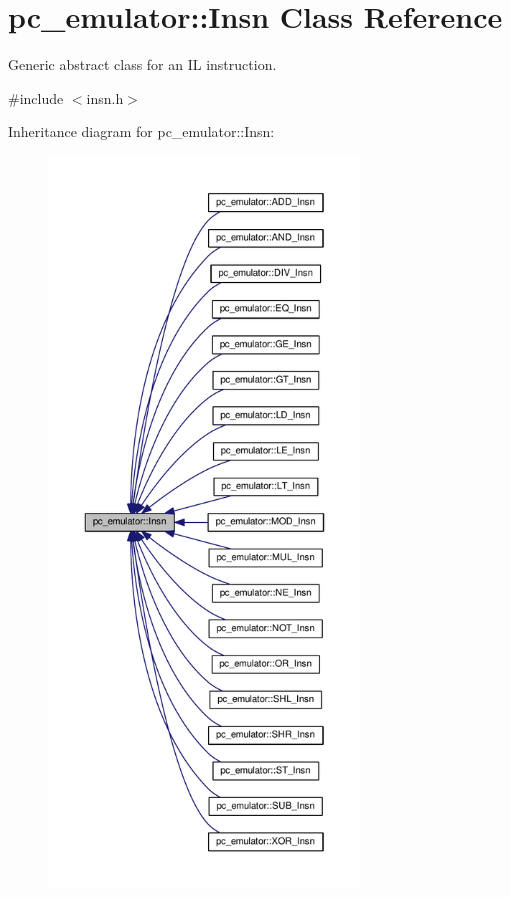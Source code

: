 \hypertarget{classpc__emulator_1_1Insn}{}\section{pc\+\_\+emulator\+:\+:Insn Class Reference}
\label{classpc__emulator_1_1Insn}


Generic abstract class for an IL instruction.  




{\ttfamily \#include $<$insn.\+h$>$}



Inheritance diagram for pc\+\_\+emulator\+:\+:Insn\+:
\nopagebreak
\begin{figure}[H]
\begin{center}
\leavevmode
\includegraphics[height=550pt]{classpc__emulator_1_1Insn__inherit__graph}
\end{center}
\end{figure}


